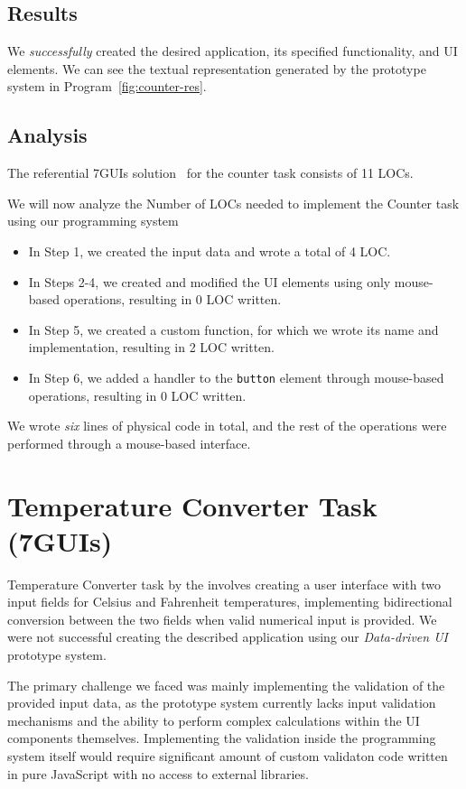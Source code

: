 \subsection{Results}
We \emph{successfully} created the desired application, its specified functionality, and UI elements.
We can see the textual representation generated by the prototype system in Program~\ref{fig:counter-res}.

\subsection{Analysis}
The referential 7GUIs solution~\cite{7guis-React-TypeScript-MobX/src/app/guis/counter.tsx} for the counter task consists of 11 LOCs.

We will now analyze the Number of LOCs needed to implement the Counter task using our programming system
\begin{itemize}
	\item In Step 1, we created the input data and wrote a total of 4 LOC.
	\item   In Steps 2-4, we created and modified the UI elements using only mouse-based operations, resulting in 0 LOC written.
	\item   In Step 5, we created a custom function, for which we wrote its name and implementation, resulting in 2 LOC written.
	\item   In Step 6, we added a handler to the \texttt{button} element through mouse-based operations, resulting in 0 LOC written.
\end{itemize}
We wrote \emph{six} lines of physical code in total, and the rest of the operations were performed through a mouse-based interface.


\section{Temperature Converter Task (7GUIs)}
Temperature Converter task by the \citet{7GUIs-web} involves creating a user interface with two input fields for Celsius and Fahrenheit temperatures,
implementing bidirectional conversion between the two fields when valid numerical input is provided.
We were not successful creating the described application using our \emph{Data-driven UI} prototype system.

The primary challenge we faced was mainly implementing the validation of the provided input data,
as the prototype system currently lacks input validation mechanisms and the ability
to perform complex calculations within the UI components themselves.
Implementing the validation inside the programming system itself would require significant amount of custom validaton code written in pure JavaScript
with no access to external libraries.

